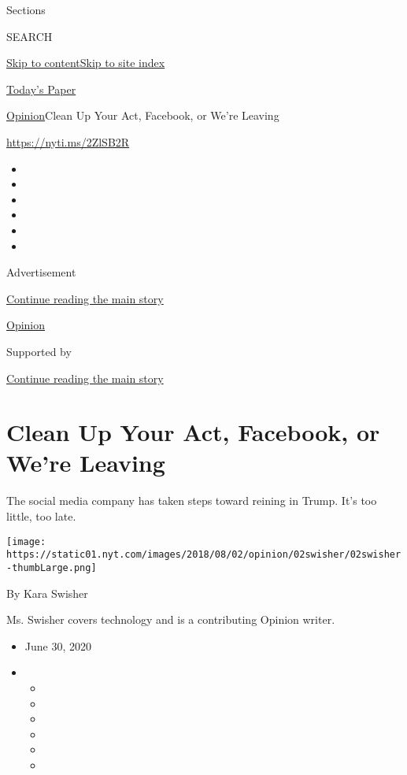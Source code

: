 Sections

SEARCH

\protect\hyperlink{site-content}{Skip to
content}\protect\hyperlink{site-index}{Skip to site index}

\href{https://myaccount.nytimes.com/auth/login?response_type=cookie\&client_id=vi}{}

\href{https://www.nytimes.com/section/todayspaper}{Today's Paper}

\href{/section/opinion}{Opinion}\textbar{}Clean Up Your Act, Facebook,
or We're Leaving

\href{https://nyti.ms/2ZlSB2R}{https://nyti.ms/2ZlSB2R}

\begin{itemize}
\item
\item
\item
\item
\item
\item
\end{itemize}

Advertisement

\protect\hyperlink{after-top}{Continue reading the main story}

\href{/section/opinion}{Opinion}

Supported by

\protect\hyperlink{after-sponsor}{Continue reading the main story}

\hypertarget{clean-up-your-act-facebook-or-were-leaving}{%
\section{Clean Up Your Act, Facebook, or We're
Leaving}\label{clean-up-your-act-facebook-or-were-leaving}}

The social media company has taken steps toward reining in Trump. It's
too little, too late.

\texttt{[image: https://static01.nyt.com/images/2018/08/02/opinion/02swisher/02swisher-thumbLarge.png]}

By Kara Swisher

Ms. Swisher covers technology and is a contributing Opinion writer.

\begin{itemize}
\item
  June 30, 2020
\item
  \begin{itemize}
  \item
  \item
  \item
  \item
  \item
  \item
  \end{itemize}
\end{itemize}

